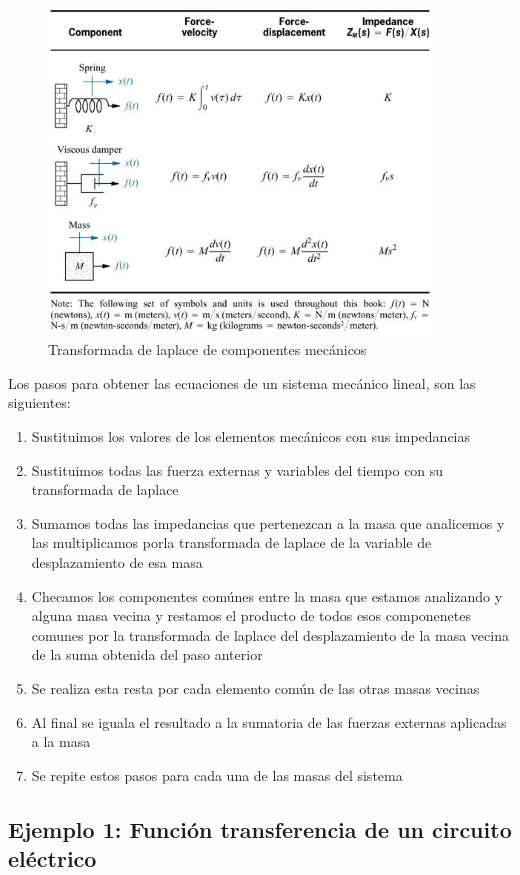 \documentclass[12pt]{book}
\theoremstyle{definition}
\theoremstyle{remark}
\theoremstyle{plain}
\begin{document}
\begin{figure}
\centering
\includegraphics[width=4in]{mecanica.jpg}
\caption{Transformada de laplace de componentes mecánicos}
\label{fig302}
\end{figure}

Los pasos para obtener las ecuaciones de un sistema mecánico lineal, son las siguientes:
\begin{enumerate}
\item Sustituimos los valores de los elementos mecánicos con sus impedancias
\item Sustituimos todas las fuerza externas y variables del tiempo con su transformada de laplace
\item Sumamos todas las impedancias que pertenezcan a la masa que analicemos y las multiplicamos porla transformada de laplace de la variable de desplazamiento de esa masa
\item Checamos los componentes comúnes entre la masa que estamos analizando y alguna masa vecina y restamos el producto de todos esos componenetes comunes por la transformada de laplace del desplazamiento de la masa vecina de la suma obtenida del paso anterior
\item Se realiza esta resta por cada elemento común de las otras masas vecinas
\item Al final se iguala el resultado a la sumatoria de las  fuerzas externas aplicadas a la masa
\item Se repite estos pasos para cada una de las masas del sistema
\end{enumerate}

\subsection{Ejemplo 1: Función transferencia de un circuito eléctrico}
\end{document}
